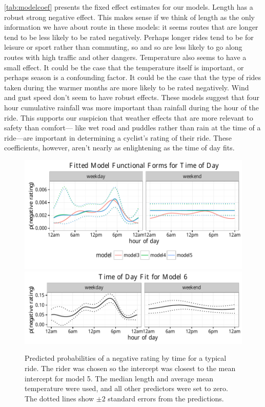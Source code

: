 \documentclass[]{article}
\begin{document}
\autoref{tab:modelcoef} presents the fixed effect estimates for our
models. Length has a robust strong negative effect. This makes sense if
we think of length as the only information we have about route in these
models: it seems routes that are longer tend to be less likely to be
rated negatively. Perhaps longer rides tend to be for leisure or sport
rather than commuting, so and so are less likely to go along routes with
high traffic and other dangers. Temperature also seems to have a small
effect. It could be the case that the temperature itself is important,
or perhaps season is a confounding factor. It could be the case that the
type of rides taken during the warmer months are more likely to be rated
negatively. Wind and gust speed don't seem to have robust effects. These
models suggest that four hour cumulative rainfall was more important
than rainfall during the hour of the ride. This supports our suspicion
that weather effects that are more relevant to safety than comfort---
like wet road and puddles rather than rain at the time of a ride---are
important in determining a cyclist's rating of their ride. These
coefficients, however, aren't nearly as enlightening as the time of day
fits.

\begin{figure}[htb]
\centering
\includegraphics{figure/time_fit_plot.pdf}
\includegraphics{figure/time_fit_plot_6.pdf}
\caption[Predicted probabilities of a negative rating by time for a typical ride]{
Predicted probabilities of a negative rating by time for a typical ride.
The rider was chosen so the intercept was closest to the mean intercept for model
5. The median length and average mean temperature were used, and all other
predictors were set to zero. The dotted lines show $\pm 2$ standard errors from
the predictions.\label{fig:model-time-fit}}
\end{figure}
\end{document}
